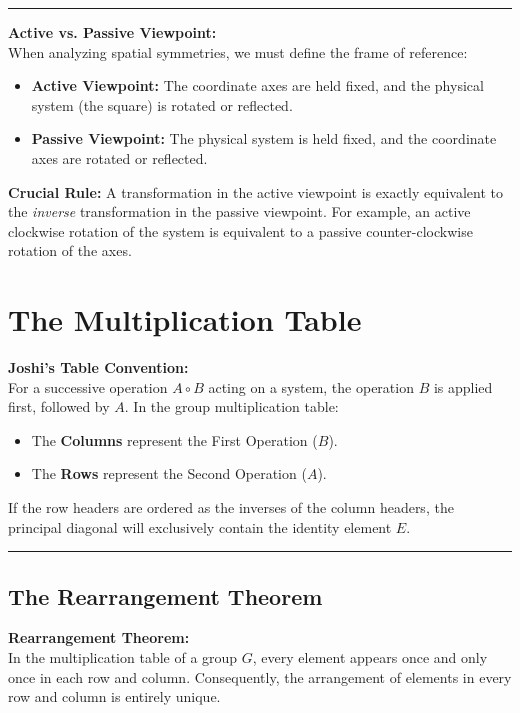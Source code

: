 \documentclass[11pt, a4paper]{report}
\begin{document}
\vspace{1em}
\hrule
\vspace{1em}

\textbf{Active vs. Passive Viewpoint:} \\
When analyzing spatial symmetries, we must define the frame of reference:
\begin{itemize}
    \item \textbf{Active Viewpoint:} The coordinate axes are held fixed, and the physical system (the square) is rotated or reflected.
    \item \textbf{Passive Viewpoint:} The physical system is held fixed, and the coordinate axes are rotated or reflected.
\end{itemize}
\textbf{Crucial Rule:} A transformation in the active viewpoint is exactly equivalent to the \textit{inverse} transformation in the passive viewpoint. For example, an active clockwise rotation of the system is equivalent to a passive counter-clockwise rotation of the axes.

\section{The Multiplication Table}

\textbf{Joshi's Table Convention:} \\
For a successive operation $A \circ B$ acting on a system, the operation $B$ is applied first, followed by $A$. 
In the group multiplication table:
\begin{itemize}
    \item The \textbf{Columns} represent the First Operation ($B$).
    \item The \textbf{Rows} represent the Second Operation ($A$).
\end{itemize}
If the row headers are ordered as the inverses of the column headers, the principal diagonal will exclusively contain the identity element $E$.

\vspace{1em}
\hrule
\vspace{1em}

\subsection*{The Rearrangement Theorem}

\textbf{Rearrangement Theorem:} \\
In the multiplication table of a group $G$, every element appears once and only once in each row and column. Consequently, the arrangement of elements in every row and column is entirely unique.
\end{document}
